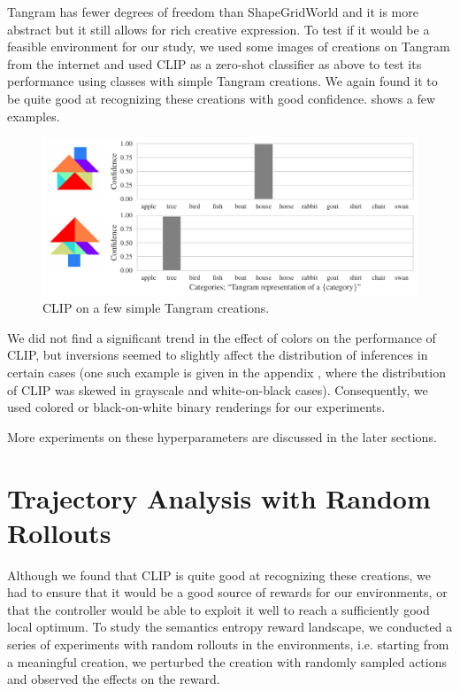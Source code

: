 Tangram has fewer degrees of freedom than ShapeGridWorld and it is more abstract but it still allows for rich creative expression.
To test if it would be a feasible environment for our study, we used some images of creations on Tangram from the internet and used CLIP as a zero-shot classifier as above to test its performance using classes with simple Tangram creations.
We again found it to be quite good at recognizing these creations with good confidence.
 shows a few examples.
\begin{figure}[h]
    \centering
    \includegraphics[width=\textwidth]{images/tangram_comparison_10.pdf}
    \caption{CLIP on a few simple Tangram creations.}
    \label{fig:clip-tangram}
\end{figure}

We did not find a significant trend in the effect of colors on the performance of CLIP, but inversions seemed to slightly affect the distribution of inferences in certain cases
(one such example is given in the appendix , where the distribution of CLIP was skewed in grayscale and white-on-black cases).
Consequently, we used colored or black-on-white binary renderings for our experiments.

More experiments on these hyperparameters are discussed in the later sections.


\section{Trajectory Analysis with Random Rollouts}
\label{sec:clip-problems}
Although we found that CLIP is quite good at recognizing these creations, we had to ensure that it would be a good source of rewards for our environments, or that the controller would be able to exploit it well to reach a sufficiently good local optimum.
To study the semantics entropy reward landscape, we conducted a series of experiments with random rollouts in the environments, i.e. starting from a meaningful creation, we perturbed the creation with randomly sampled actions and observed the effects on the reward.

